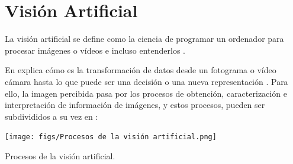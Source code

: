 \pagebreak

\section{Visión Artificial}
\label{sec:VA} 

La visión artificial se define como la ciencia de programar un ordenador para procesar imágenes o vídeos e incluso entenderlos \cite{Culjak12}. 

En \cite{Bradski08} explica cómo es la transformación de datos desde un fotograma o vídeo cámara hasta lo que puede ser una decisión o una nueva representación \cite{Alvear17}. Para ello, la imagen percibida pasa por los procesos de obtención, caracterización e interpretación de información de imágenes, y estos procesos, pueden ser subdivididos a su vez en \cite{Santillan15}:\\

\begin{table} [h!]
  \begin{center}
      \texttt{[image: figs/Procesos de la visión artificial.png]}
  \end{center}
  \caption{Procesos de la visión artificial.}
  \label{cuadro:procesos_VA}
\end{table}

